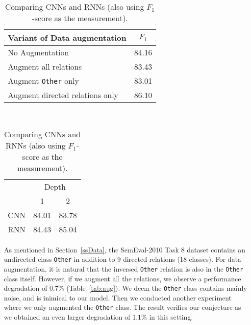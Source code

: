 \documentclass[11pt]{article}
\begin{document}
\begin{table}[!t]
\centering
\bigskip
\begin{minipage}{0.55\textwidth}
\centering
\begin{tabular}{lc}
\hline
\textbf{Variant of Data augmentation\quad\quad} & \textbf{$F_1$}\\
\hline
No Augmentation & 84.16\\
Augment all relations     & 83.43\\
Augment {\tt Other} only & 83.01\\
Augment directed relations only & 86.10\\
\hline
\end{tabular}
\caption{Comparing variants of data augmentation.}\label{tab:aug}
\end{minipage}~~
\begin{minipage}{.4\textwidth}
\centering
\begin{tabular}{c|cc}
\hline
 & \multicolumn{2}{c}{Depth}\\
 \cline{2-3}
 & \hspace{.3cm}1\hspace{.3cm} &\hspace{.3cm} 2\hspace{.3cm}\\
\hline
\hspace{.3cm}CNN \hspace{.3cm}&\hspace{.3cm} 84.01 \hspace{.3cm}& \hspace{.3cm}83.78\hspace{.3cm}\\
\hspace{.3cm}RNN \hspace{.3cm}&\hspace{.3cm} 84.43 \hspace{.3cm}& \hspace{.3cm}85.04\hspace{.3cm}\\
\hline
\end{tabular}
\caption{Comparing CNNs and RNNs (also using $F_1$-score as the measurement).}\label{tab:CNN}
\end{minipage}
\end{table}


As mentioned in Section~\ref{ssData}, the SemEval-2010 Task 8 dataset contains an undirected class {\tt Other} in addition to 9 directed relations (18 classes). For data augmentation, it is natural that the inversed {\tt Other} relation is also in the {\tt Other} class itself. However, if we augment all the relations, we observe a performance degradation of 0.7\% (Table~\ref{tab:aug}). We deem the {\tt Other} class contains mainly noise, and is inimical to our model. Then we conducted another experiment where we only augmented the {\tt Other} class. The result verifies our conjecture as we obtained an even larger degradation of 1.1\% in this setting.
\end{document}
